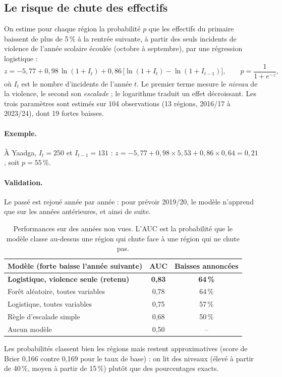 \documentclass[11pt,a4paper]{article}
\begin{document}
\subsection{Le risque de chute des effectifs}
On estime pour chaque région la probabilité $p$ que les effectifs du primaire baissent de plus de 5\,\% à la rentrée suivante, à partir des seuls incidents de violence de l'année scolaire écoulée (octobre à septembre), par une régression logistique :
\begin{equation}
z = -5{,}77 + 0{,}98\,\ln(1+I_t) + 0{,}86\,\bigl[\ln(1+I_t) - \ln(1+I_{t-1})\bigr],\qquad p = \frac{1}{1+e^{-z}},
\end{equation}
où $I_t$ est le nombre d'incidents de l'année $t$. Le premier terme mesure le \emph{niveau} de la violence, le second son \emph{escalade} ; le logarithme traduit un effet décroissant. Les trois paramètres sont estimés sur 104 observations (13 régions, 2016/17 à 2023/24), dont 19 fortes baisses.

\paragraph{Exemple.} À Yaadga, $I_t = 250$ et $I_{t-1} = 131$ : $z = -5{,}77 + 0{,}98 \times 5{,}53 + 0{,}86 \times 0{,}64 = 0{,}21$, soit $p = 55$\,\%.

\paragraph{Validation.} Le passé est rejoué année par année : pour prévoir 2019/20, le modèle n'apprend que sur les années antérieures, et ainsi de suite.
\begin{table}[H]\centering\small
\begin{tabular}{@{}lcc@{}}\toprule
Modèle (forte baisse l'année suivante) & AUC & Baisses annoncées\\\midrule
\textbf{Logistique, violence seule (retenu)} & \textbf{0,83} & \textbf{64\,\%}\\
Forêt aléatoire, toutes variables & 0,78 & 64\,\%\\
Logistique, toutes variables & 0,75 & 57\,\%\\
Règle d'escalade simple & 0,68 & 50\,\%\\
Aucun modèle & 0,50 & --\\\bottomrule
\end{tabular}\caption{Performances sur des années non vues. L'AUC est la probabilité que le modèle classe au-dessus une région qui chute face à une région qui ne chute pas.}\end{table}
Les probabilités classent bien les régions mais restent approximatives (score de Brier 0,166 contre 0,169 pour le taux de base) : on lit des niveaux (élevé à partir de 40\,\%, moyen à partir de 15\,\%) plutôt que des pourcentages exacts.
\end{document}
